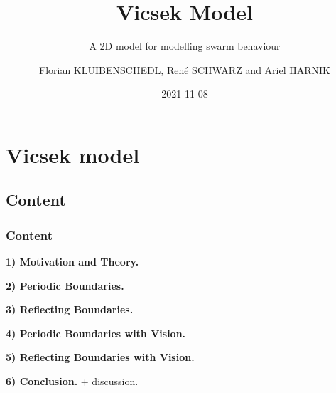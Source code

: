 \documentclass[11pt,t,usepdftitle=false,aspectratio=169]{beamer}
\title[Vicsek Model]{Vicsek Model}
\subtitle{A 2D model for modelling swarm behaviour}
\author[Florian Kluibenschedl, René Schwarz, Ariel Harnik]{Florian KLUIBENSCHEDL, René SCHWARZ and Ariel HARNIK}
\date{2021-11-08}
\begin{document}



	\section{Vicsek model}

	\subsection{Content}
	\begin{frame}
		\frametitle{Content}
  		\textbf{1) Motivation and Theory.} 
  		
  		\bigskip
  		\textbf{2) Periodic Boundaries.} 
  		
  		\bigskip
  		\textbf{3) Reflecting Boundaries.}
  		
  		\bigskip
  		\textbf{4) Periodic Boundaries with Vision.}
  		
  		\bigskip
  		\textbf{5) Reflecting Boundaries with Vision.}
  		
  		\bigskip
  		\textbf{6) Conclusion.} + discussion.
	\end{frame}
\end{document}
